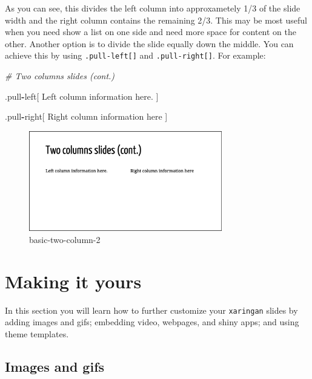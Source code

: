 \documentclass[
]{book}
\newenvironment{Shaded}{\begin{snugshade}}{\end{snugshade}}
\newcommand{\CommentTok}[1]{\textcolor[rgb]{0.37,0.37,0.37}{\textit{#1}}}
\newcommand{\NormalTok}[1]{#1}
\newcommand{\OperatorTok}[1]{\textcolor[rgb]{0.43,0.43,0.43}{\textbf{#1}}}
\begin{document}
As you can see, this divides the left column into approxametely 1/3 of the slide width and the right column contains the remaining 2/3. This may be most useful when you need show a list on one side and need more space for content on the other. Another option is to divide the slide equally down the middle. You can achieve this by using \texttt{.pull-left{[}{]}} and \texttt{.pull-right{[}{]}}. For example:

\begin{Shaded}
\begin{Highlighting}[]
\CommentTok{# Two columns slides (cont.)}

\NormalTok{.pull}\OperatorTok{-}\NormalTok{left[}
\NormalTok{Left column information here.}
\NormalTok{]}

\NormalTok{.pull}\OperatorTok{-}\NormalTok{right[}
\NormalTok{Right column information here}
\NormalTok{]}
\end{Highlighting}
\end{Shaded}

\begin{figure}
\centering
\includegraphics[width=0.75\textwidth,height=\textheight]{img/02_basics-two-column_2.png}
\caption{basic-two-column-2}
\end{figure}

\hypertarget{making-it-yours}{%
\section{Making it yours}\label{making-it-yours}}

In this section you will learn how to further customize your \texttt{xaringan} slides by adding images and gifs; embedding video, webpages, and shiny apps; and using theme templates.

\hypertarget{images-and-gifs}{%
\subsection{Images and gifs}\label{images-and-gifs}}
\end{document}
